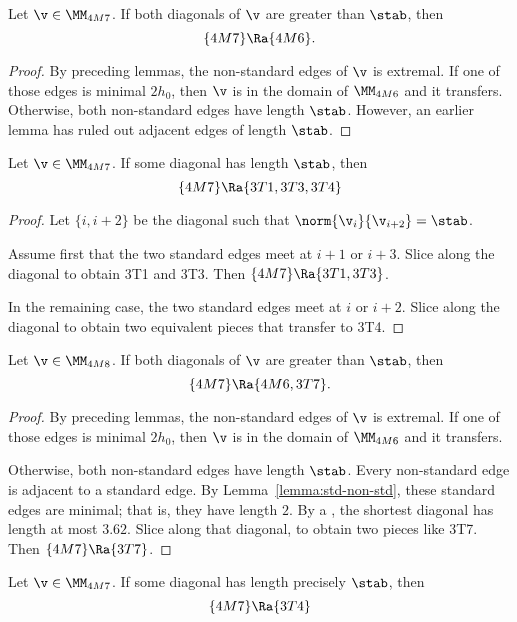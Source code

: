 \begin{lemma}[]
Let $\v\in \MM_{4M7}$.  If both diagonals of $\v$ are greater than $\stab$, then
\[
\{4M7\}\Ra \{4M6\}.
\]
\end{lemma}

\begin{proof}
By preceding lemmas, the non-standard edges of $\v$ is extremal.  If one of those
edges is minimal $2h_0$, then $\v$ is in the domain of $\MM_{4M6}$ and it transfers.
Otherwise, both non-standard edges have length $\stab$.  However, an
earlier lemma has ruled out adjacent edges of length $\stab$.
\end{proof}

\begin{lemma}[]
Let $\v\in \MM_{4M7}$.  If some diagonal has length $\stab$, then
\[
\{4M7\}\Ra \{3T1,3T3,3T4\}
\]
\end{lemma}

\begin{proof} Let $\{i,i+2\}$ be the diagonal such that $\norm{\v_i}{\v_{i+2}} = \stab$.

Assume first that the two standard edges meet at $i+1$ or $i+3$.
Slice along the diagonal to obtain 3T1 and 3T3.  Then $\{4M7\}\Ra\{3T1,3T3\}$.

In the remaining case, the two standard edges meet at $i$ or $i+2$.
Slice along the diagonal to obtain two equivalent pieces that transfer to 3T4.
\end{proof}

\begin{lemma}[]
Let $\v\in \MM_{4M8}$.  If both diagonals of $\v$ are greater than $\stab$, then
\[
\{4M7\}\Ra \{4M6,3T7\}.
\]
\end{lemma}

\begin{proof}
By preceding lemmas, the non-standard edges of $\v$ is extremal.  If one of those
edges is minimal $2h_0$, then $\v$ is in the domain of $\MM_{4M6}$ and it transfers.

Otherwise, both non-standard edges have length $\stab$.  Every non-standard edge
is adjacent to a standard edge.  By Lemma~\ref{lemma:std-non-std}, these standard edges
are minimal; that is, they have length $2$.  By a , the shortest diagonal has length
at most $3.62$.  Slice along that diagonal, to obtain two pieces like 3T7.
Then $\{4M7\}\Ra\{3T7\}$.
\end{proof}

\begin{lemma}[]
Let $\v\in \MM_{4M7}$.  If some diagonal has length precisely $\stab$, then
\[
\{4M7\}\Ra \{3T4\}
\]
\end{lemma}

